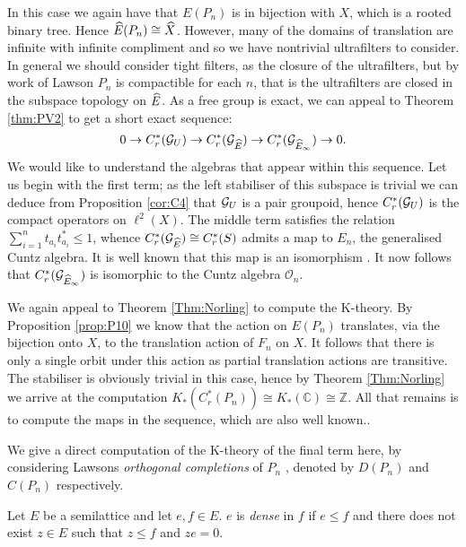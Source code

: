 \begin{example}
\begin{example}
In this case we again have that $E(P_{n})$ is in bijection with $X$, which is a rooted binary tree. Hence $\widehat{E}(P_{n}) \cong \widehat{X}$. However, many of the domains of translation are infinite with infinite compliment and so we have nontrivial ultrafilters to consider. In general we should consider tight filters, as the closure of the ultrafilters, but by work of Lawson \cite{lawson-2011-1} $P_{n}$ is compactible for each $n$, that is the ultrafilters are closed in the subspace topology on $\widehat{E}$. As a free group is exact, we can appeal to Theorem \ref{thm:PV2} to get a short exact sequence:
\begin{equation*}
0 \rightarrow C^{*}_{r}(\mathcal{G}_{U}) \rightarrow C^{*}_{r}(\mathcal{G}_{\widehat{E}}) \rightarrow C^{*}_{r}(\mathcal{G}_{\widehat{E}_{\infty}}) \rightarrow 0.
\end{equation*}
We would like to understand the algebras that appear within this sequence. Let us begin with the first term; as the left stabiliser of this subspace is trivial we can deduce from Proposition \ref{cor:C4} that $\mathcal{G}_{U}$ is a pair groupoid, hence $C^{*}_{r}(\mathcal{G}_{U})$ is the compact operators on $\ell^{2}(X)$. The middle term satisfies the relation $\sum_{i=1}^{n}t_{a_{i}}t_{a_{i}}^{*} \leq 1$, whence $C^{*}_{r}(\mathcal{G}_{\widehat{E}}) \cong C^{*}_{r}(S)$ admits a map to $E_{n}$, the generalised Cuntz algebra. It is well known that this map is an isomorphism \cite{MR1724106,MR584266}. It now follows that $C^{*}_{r}(\mathcal{G}_{\widehat{E}_{\infty}})$ is isomorphic to the Cuntz algebra $\mathcal{O}_{n}$.

We again appeal to Theorem \ref{Thm:Norling} to compute the K-theory. By Proposition \ref{prop:P10} we know that the action on $E(P_{n})$ translates, via the bijection onto $X$, to the translation action of $F_{n}$ on $X$. It follows that there is only a single orbit under this action as partial translation actions are transitive. The stabiliser is obviously trivial in this case, hence by Theorem \ref{Thm:Norling} we arrive at the computation $K_{*}(C^{*}_{r}(P_{n})) \cong K_{*}(\mathbb{C})\cong \mathbb{Z}$. All that remains is to compute the maps in the sequence, which are also well known..

We give a direct computation of the K-theory of the final term here, by considering Lawsons \textit{orthogonal completions} of $P_{n}$ \cite{lawson-2011-1}, denoted by $D(P_{n})$ and $C(P_{n})$ respectively.

\begin{definition}
Let $E$ be a semilattice and let $e,f \in E$. $e$ is \textit{dense} in $f$ if $e \leq f$ and there does not exist $z \in E$ such that $z \leq f$ and $ze=0$. 
\end{definition}


\end{example}
\end{example}

